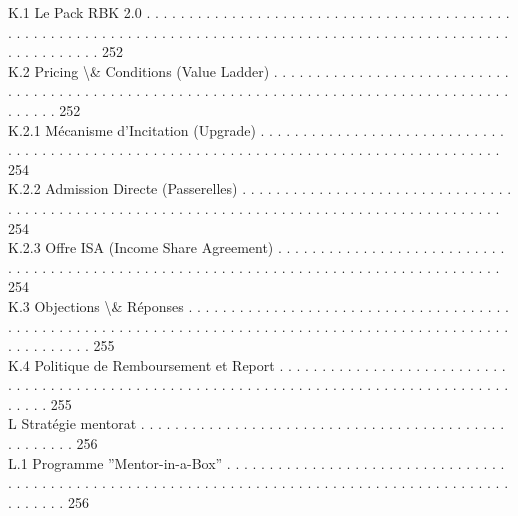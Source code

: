 \documentclass[12pt,landscape,a4paper]{article}
\begin{document}
K.1     Le Pack RBK 2.0 . . . . . . . . . . . . . . . . . . . . . . . . . . . . . . . . . . . . . . . . . . . . . . . . . . . . . . . . . . . . . . . . . . . . . . . . . . . . . . . . . . . . . . . . . . . . . . . . . . . . . . . . . . . . . . . . . 252\\
K.2     Pricing \textbackslash{}& Conditions (Value Ladder) . . . . . . . . . . . . . . . . . . . . . . . . . . . . . . . . . . . . . . . . . . . . . . . . . . . . . . . . . . . . . . . . . . . . . . . . . . . . . . . . . . . . . . . . . . . . . 252\\
K.2.1               Mécanisme d’Incitation (Upgrade) . . . . . . . . . . . . . . . . . . . . . . . . . . . . . . . . . . . . . . . . . . . . . . . . . . . . . . . . . . . . . . . . . . . . . . . . . . . . . . . . . . . . . . . 254\\
K.2.2               Admission Directe (Passerelles) . . . . . . . . . . . . . . . . . . . . . . . . . . . . . . . . . . . . . . . . . . . . . . . . . . . . . . . . . . . . . . . . . . . . . . . . . . . . . . . . . . . . . . . . . . 254\\
K.2.3               Offre ISA (Income Share Agreement) . . . . . . . . . . . . . . . . . . . . . . . . . . . . . . . . . . . . . . . . . . . . . . . . . . . . . . . . . . . . . . . . . . . . . . . . . . . . . . . . . . . . . 254\\
K.3     Objections \textbackslash{}& Réponses . . . . . . . . . . . . . . . . . . . . . . . . . . . . . . . . . . . . . . . . . . . . . . . . . . . . . . . . . . . . . . . . . . . . . . . . . . . . . . . . . . . . . . . . . . . . . . . . . . . . . . . . . . . 255\\
K.4     Politique de Remboursement et Report . . . . . . . . . . . . . . . . . . . . . . . . . . . . . . . . . . . . . . . . . . . . . . . . . . . . . . . . . . . . . . . . . . . . . . . . . . . . . . . . . . . . . . . . . . . 255\\
\vspace{0.5em}
L     Stratégie mentorat . . . . . . . . . . . . . . . . . . . . . . . . . . . . . . . . . . . . . . . . . . . . . . . . . . . 256\\
L.1     Programme ”Mentor-in-a-Box” . . . . . . . . . . . . . . . . . . . . . . . . . . . . . . . . . . . . . . . . . . . . . . . . . . . . . . . . . . . . . . . . . . . . . . . . . . . . . . . . . . . . . . . . . . . . . . . . . . . 256\\
\vspace{0.5em}
\vspace{0.5em}
\end{document}
